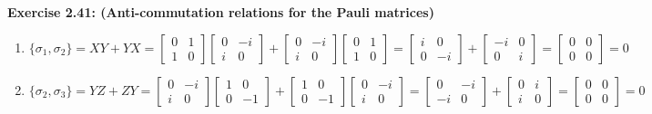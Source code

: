 \documentclass{article}
\begin{document}
\bigskip

\begin{framed}
    \noindent \textbf{Exercise 2.41: (Anti-commutation relations for the Pauli matrices)}
    
    \medskip
    \begin{enumerate}
        \item $\{\sigma_1, \sigma_2\} = XY + YX = \begin{bmatrix}0 & 1 \\ 1 & 0\end{bmatrix} \begin{bmatrix}0 & -i \\ i & 0\end{bmatrix} + \begin{bmatrix}0 & -i \\ i & 0\end{bmatrix} \begin{bmatrix}0 & 1 \\ 1 & 0\end{bmatrix} = \begin{bmatrix}i & 0 \\ 0 & -i\end{bmatrix} + \begin{bmatrix}-i & 0 \\ 0 & i\end{bmatrix} = \begin{bmatrix}0 & 0 \\ 0 & 0\end{bmatrix} = 0$
        \item $\{\sigma_2, \sigma_3\} = YZ + ZY = \begin{bmatrix}0 & -i \\ i & 0\end{bmatrix} \begin{bmatrix}1 & 0 \\ 0 & -1\end{bmatrix} + \begin{bmatrix}1 & 0 \\ 0 & -1\end{bmatrix} \begin{bmatrix}0 & -i \\ i & 0\end{bmatrix} = \begin{bmatrix}0 & -i \\ -i & 0\end{bmatrix} + \begin{bmatrix}0 & i \\ i & 0\end{bmatrix} = \begin{bmatrix}0 & 0 \\ 0 & 0\end{bmatrix} = 0$

\end{enumerate}
\end{framed}
\end{document}
